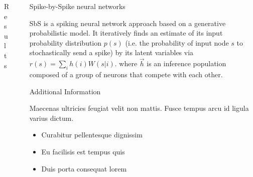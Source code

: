 \documentclass[final]{beamer}
\newlength{\sepwid}
\newlength{\onecolwid}
\newlength{\twocolwid}
\begin{document}
\begin{frame}[t]
\begin{columns}[t]
\begin{column}{\twocolwid}
\begin{columns}[t,totalwidth=\twocolwid]
\begin{column}{\onecolwid}
\begin{block}{Results}
\end{block}


\end{column} %

\end{columns} %

\end{column} %

\begin{column}{\sepwid}\end{column} %

\begin{column}{\onecolwid} %


\begin{block}{Spike-by-Spike neural networks}

SbS is a spiking neural network approach based on a
generative probabilistic model. It iteratively finds an estimate of
its input probability distribution $p(s)$ (i.e. the probability of
input node $s$ to stochastically send a spike) by its latent variables
via $r(s) = \sum_i h(i) W(s|i)$. 
where $\vec{h}$ is an inference
population composed of a group of neurons that compete with each
other.



\end{block}


\begin{block}{Additional Information}

Maecenas ultricies feugiat velit non mattis. Fusce tempus arcu id ligula varius dictum. 
\begin{itemize}
\item Curabitur pellentesque dignissim
\item Eu facilisis est tempus quis
\item Duis porta consequat lorem
\end{itemize}


\end{block}
\end{column}
\end{columns}
\end{frame}
\end{document}
